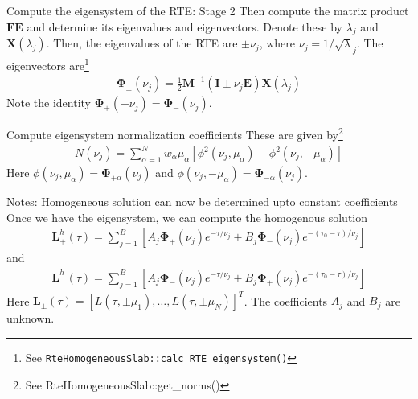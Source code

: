\documentclass[14]{beamer}
\newcommand{\mvec}[1]{\mathbf{#1}}
\newcommand{\gvec}[1]{\boldsymbol{#1}}
\begin{document}
\begin{frame}{Compute the eigensystem of the RTE: Stage 2}
  Then compute the matrix product $\mvec{F}\mvec{E}$ and determine its
  eigenvalues and eigenvectors. Denote these by $\lambda_j$ and
  $\mvec{X}(\lambda_j)$.  Then, the eigenvalues of the RTE are $\pm
  \nu_j$, where $\nu_j = 1/\sqrt\lambda_j$. The eigenvectors
  are\footnote{See {\tt RteHomogeneousSlab::calc\_RTE\_eigensystem()}}
  \begin{align}
    \gvec{\Phi}_\pm (\nu_j)
    = \frac{1}{2}\mvec{M}^{-1}
    (\mvec{I} \pm \nu_j\mvec{E})\mvec{X}(\lambda_j)
  \end{align}
  Note the identity $\gvec{\Phi}_+(-\nu_j) =
  \gvec{\Phi}_-(\nu_j)$.
\end{frame}

\begin{frame}{Compute eigensystem normalization coefficients}
  These are given by\footnote{See RteHomogeneousSlab::get\_norms()}
  \begin{align}
    N(\nu_j) = \sum_{\alpha=1}^N
    w_\alpha \mu_\alpha
    \left[
      \phi^2(\nu_j,\mu_\alpha) - \phi^2(\nu_j,-\mu_\alpha)
    \right]
  \end{align}
  Here $\phi(\nu_j,\mu_\alpha) = \gvec{\Phi}_{+\alpha}(\nu_j)$ and
  $\phi(\nu_j,-\mu_\alpha) = \gvec{\Phi}_{-\alpha}(\nu_j)$.

\end{frame}

\begin{frame}{Notes: Homogeneous solution can now be determined upto
    constant coefficients}
  Once we have the eigensystem, we can compute the homogenous solution
  \begin{align}
    \mvec{L}^h_+(\tau) = \sum_{j=1}^B
    \left[
      A_j \gvec{\Phi}_+(\nu_j) e^{-\tau/\nu_j} +
      B_j \gvec{\Phi}_-(\nu_j) e^{-(\tau_0-\tau)/\nu_j}
    \right]
  \end{align}
  and
  \begin{align}
    \mvec{L}^h_-(\tau) = \sum_{j=1}^B
    \left[
      A_j \gvec{\Phi}_-(\nu_j) e^{-\tau/\nu_j} +
      B_j \gvec{\Phi}_+(\nu_j) e^{-(\tau_0-\tau)/\nu_j}
    \right]
  \end{align}
  Here $\mvec{L}_\pm(\tau) = [L(\tau,\pm\mu_1),\ldots,
  L(\tau,\pm\mu_N)]^T$. The coefficients $A_j$ and $B_j$ are unknown.
\end{frame}
\end{document}
